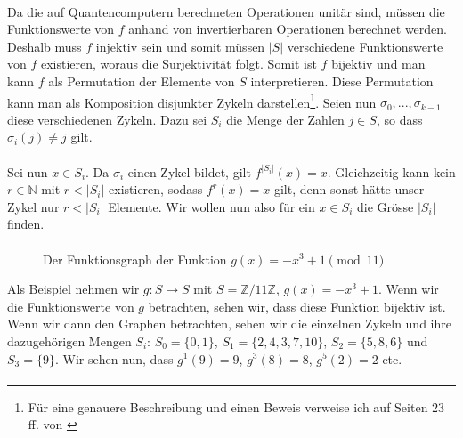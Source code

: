 \paragraph{}
Da die auf Quantencomputern berechneten Operationen unitär sind, müssen die Funktionswerte von $f$ anhand von invertierbaren Operationen berechnet werden. Deshalb muss $f$ injektiv sein und somit müssen $|S|$ verschiedene Funktionswerte von $f$ existieren, woraus die Surjektivität folgt. Somit ist $f$ bijektiv und man kann $f$ als Permutation der Elemente von $S$ interpretieren. Diese Permutation kann man als Komposition disjunkter Zykeln darstellen\footnote{Für eine genauere Beschreibung und einen Beweis verweise ich auf Seiten 23 ff. von \cite{perm}}.
Seien nun $\sigma_0, ..., \sigma_{k - 1}$ diese verschiedenen Zykeln. Dazu sei $S_i$ die Menge der Zahlen $j \in S$, so dass $\sigma_i(j) \neq j$ gilt.
\paragraph{}
Sei nun $x \in S_i$. Da $\sigma_i$ einen Zykel bildet, gilt $f^{|S_i|}(x) = x$. Gleichzeitig kann kein $r \in \mathbb{N}$ mit $r < |S_i|$ existieren, sodass $f^r(x) = x$ gilt, denn sonst hätte unser Zykel nur $r < |S_i|$ Elemente. Wir wollen nun also für ein $x \in S_i$ die Grösse $|S_i|$ finden.

\paragraph{}
\begin{wrapfigure}{l}{0.5\textwidth}

\caption{\small Der Funktionsgraph der Funktion $g(x) = -x^3 + 1 \pmod{11}$}
\end{wrapfigure}

Als Beispiel nehmen wir $g : S \rightarrow S$ mit $S = \mathbb{Z}/11\mathbb{Z}$, $g(x) = -x^3 + 1$. Wenn wir die Funktionswerte von $g$ betrachten, sehen wir, dass diese Funktion bijektiv ist. Wenn wir dann den Graphen betrachten, sehen wir die einzelnen Zykeln und ihre dazugehörigen Mengen $S_i$: $S_0 = \{0, 1\}$, $S_1 = \{2, 4, 3, 7, 10\}$, $S_2 = \{5, 8, 6\}$ und $S_3 = \{9\}$. Wir sehen nun, dass $g^1(9) = 9$, $g^3(8) = 8$, $g^5(2) = 2$ etc. 

\paragraph{}

